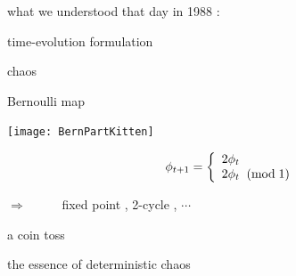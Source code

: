 \renewcommand{\ssp}{\ensuremath{x}}               %

\begin{frame}{what we understood that day in 1988 : }
\vfill
    \begin{center}
{\huge time-evolution formulation}
    \end{center}
\vfill
\end{frame} %

\begin{frame}{chaos} %
\renewcommand{\ssp}{\ensuremath{\phi}}             %
    \begin{block}{{Bernoulli}  map} %
\begin{center}
            \begin{minipage}[c]{0.36\textwidth}\begin{center}
\texttt{[image: BernPartKitten]}
            \end{center}\end{minipage}
            \hspace{2ex}
            \begin{minipage}[c]{0.46\textwidth}\begin{center}
\[
\ssp_{\zeit+1} =
\left\{ \begin{array}{l} %
        2 \ssp_{\zeit}
                             \\%
        2 \ssp_{\zeit} \;\; (\mbox{mod}\;1)
         \end{array}\right.
\]
            \end{center}\end{minipage}
\end{center}

\hfill $\Rightarrow$~~~~~
fixed point , 2-cycle , $\cdots$
    \end{block}

\bigskip

a 
{coin toss}

\hfill the essence of {\color{blue}deterministic chaos}
\end{frame} %

